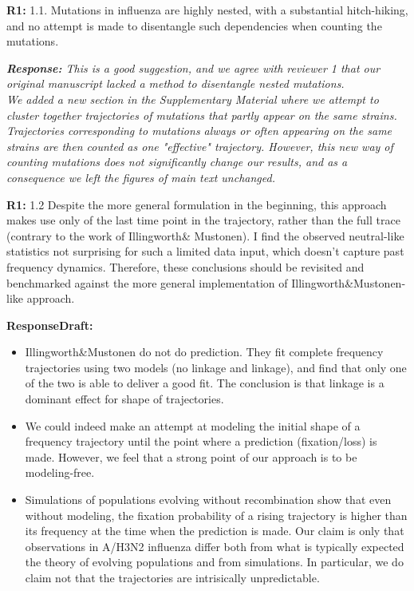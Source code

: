\documentclass[aps,rmp,onecolumn]{revtex4-1}
\newcommand{\refa}[1]{\textbf{R1:} #1\vskip 5mm}
\newcommand{\response}[1]{{\it {\color{response}\textbf{Response:} #1}}\vskip 5mm}
\newcommand{\responsedraft}[1]{{\it {\color{purple}\textbf{ResponseDraft:} #1}}}
\begin{document}
\refa{1.1. Mutations in influenza are highly nested, with a substantial
hitch-hiking, and no attempt is made to disentangle such dependencies when counting the mutations.}

\response{This is a good suggestion, and we agree with reviewer 1 that our original manuscript lacked a method to disentangle nested mutations. \\
We added a new section in the Supplementary Material where we attempt to cluster together trajectories of mutations that partly appear on the same strains. 
Trajectories corresponding to mutations always or often appearing on the same strains are then counted as one "effective" trajectory. 
However, this new way of counting mutations does not significantly change our results, and as a consequence we left the figures of main text unchanged.}

\refa{1.2 Despite the more general formulation in the beginning, this
approach makes use only of the last time point in the trajectory,
rather than the full trace (contrary to the work of Illingworth\&
Mustonen). I find the observed neutral-like statistics not surprising
for such a limited data input, which doesn't capture past frequency dynamics. Therefore, these conclusions should be
revisited and benchmarked against the more general implementation of Illingworth\&Mustonen-like approach.}

\responsedraft{
	\begin{itemize}
		\item Illingworth\&Mustonen do not do prediction. They fit complete frequency trajectories using two models (no linkage and linkage), and find that only one of the two is able to deliver a good fit. The conclusion is that linkage is a dominant effect for shape of trajectories. 
		\item We could indeed make an attempt at modeling the initial shape of a frequency trajectory until the point where a prediction (fixation/loss) is made. However, we feel that a strong point of our approach is to be modeling-free. 
		\item Simulations of populations evolving without recombination show that even without modeling, the fixation probability of a rising trajectory is higher than its frequency at the time when the prediction is made. Our claim is only that observations in A/H3N2 influenza differ both from what is typically expected the theory of evolving populations and from simulations. In particular, we do claim not that the trajectories are intrisically unpredictable. 
	\end{itemize}
}
\end{document}
